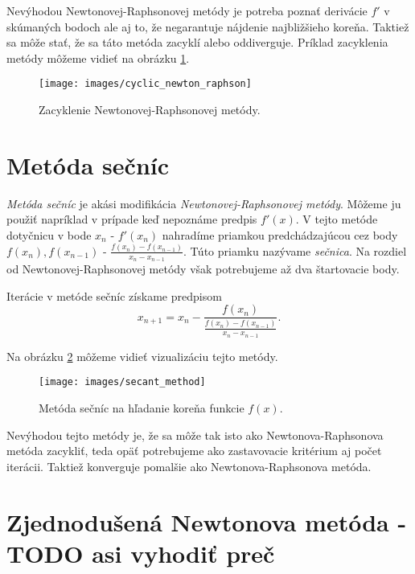 Nevýhodou Newtonovej-Raphsonovej metódy je potreba poznať derivácie $f'$ v skúmaných bodoch ale aj to, 
že negarantuje nájdenie
najbližšieho koreňa. Taktiež sa môže stať, že sa táto metóda zacyklí alebo oddiverguje. 
Príklad zacyklenia metódy môžeme vidieť
na obrázku \ref{obr:cyclic_newton_raphson}.

\begin{figure}
    \centerline{\texttt{[image: images/cyclic\_newton\_raphson]}}
    \caption[Zacyklenie Newtonovej-Raphsonovej metódy]{Zacyklenie Newtonovej-Raphsonovej metódy.}
    \label{obr:cyclic_newton_raphson}
\end{figure}
\iffalse

\section{Metóda sečníc}

\textit{Metóda sečníc} je akási modifikácia \textit{Newtonovej-Raphsonovej metódy}. 
Môžeme ju použiť napríklad v prípade keď nepoznáme predpis $f'(x)$. 
V tejto metóde dotyčnicu v bode $x_n$ - $f'(x_n)$ nahradíme priamkou 
predchádzajúcou cez body $f(x_n), f(x_{n-1})$ - $\frac{f(x_n) - f(x_{n-1})}{x_n - x_{n-1}}$. 
Túto priamku nazývame \textit{sečnica}. 
Na rozdiel od Newtonovej-Raphsonovej metódy však potrebujeme až dva štartovacie body.

Iterácie v metóde sečníc získame predpisom
$$ x_{n+1} = x_n - \frac{f(x_n)}{\frac{f(x_n) - f(x_{n-1})}{x_n - x_{n-1}}}.$$

Na obrázku \ref{obr:secant_method} môžeme vidieť vizualizáciu tejto metódy.

\begin{figure}
    \centerline{\texttt{[image: images/secant\_method]}}
    \caption[Metóda sečníc]{Metóda sečníc na hľadanie koreňa funkcie $f(x)$.}
    \label{obr:secant_method}
\end{figure}

Nevýhodou tejto metódy je, že sa môže tak isto ako Newtonova-Raphsonova metóda zacykliť, teda 
opäť potrebujeme ako zastavovacie kritérium aj počet iterácii. Taktiež konverguje
pomalšie ako Newtonova-Raphsonova metóda.

\section{Zjednodušená Newtonova metóda - TODO asi vyhodiť preč}

